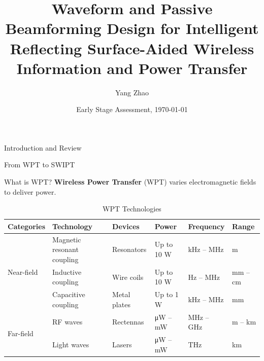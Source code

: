 \documentclass[9pt]{beamer}
\title[Waveform and Passive Beamforming Design for IRS-Aided SWIPT]{Waveform and Passive Beamforming Design for Intelligent Reflecting Surface-Aided Wireless Information and Power Transfer}
\author{Yang Zhao}
\institute{Department of Electrical and Electronic Engineering\\ Imperial College London}
\date{Early Stage Assessment, \today}
\begin{document}
\frame{\titlepage}

\begin{section}{Introduction and Review}
	\begin{subsection}{From WPT to SWIPT}
		\begin{frame}{What is WPT?}
			\textbf{Wireless Power Transfer} (WPT) varies electromagnetic fields to deliver power.
			\begin{table}
				\scriptsize
				\caption{WPT Technologies}
				\begin{tabular}{|l|l|l|l|l|l|}
					\hline
					Categories                  & Technology                 & Devices           & Power                        & Frequency          & Range           \\ \hline
					\multirow{3}{*}{Near-field} & Magnetic resonant coupling & Resonators        & Up to 10 \si{\W}             & kHz -- MHz         & m               \\ \cline{2-6}
												& Inductive coupling         & Wire coils        & Up to 10 \si{\W}             & Hz -- MHz          & mm -- cm        \\ \cline{2-6}
												& Capacitive coupling        & Metal plates      & Up to 1 \si{\W}              & kHz -- MHz         & mm              \\ \hline
					\multirow{2}{*}{Far-field}  & \alert{RF waves}           & \alert{Rectennas} & \alert{\si{\uW} -- \si{\mW}} & \alert{MHz -- GHz} & \alert{m -- km} \\ \cline{2-6}
												& Light waves                & Lasers            & \si{\uW} -- \si{\mW}         & THz                & km              \\ \hline
				\end{tabular}
			\end{table}
		\end{frame}


\end{subsection}
\end{section}
\end{document}

